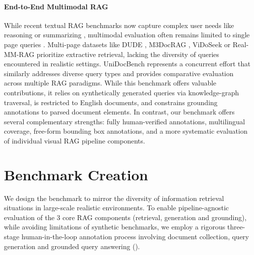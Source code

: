 \paragraph{End-to-End Multimodal RAG} While recent textual RAG benchmarks now capture complex user needs like reasoning or summarizing , multimodal evaluation often remains limited to single page queries . Multi-page datasets like DUDE , M3DocRAG , ViDoSeek  or Real-MM-RAG  prioritize extractive retrieval, lacking the diversity of queries encountered in realistic settings. 
UniDocBench  represents a concurrent effort that similarly addresses diverse query types and provides comparative evaluation across multiple RAG paradigms. While this benchmark offers valuable contributions, it relies on synthetically generated queries via knowledge-graph traversal, is restricted to English documents, and constrains grounding annotations to parsed document elements. In contrast, our benchmark offers several complementary strengths: fully human-verified annotations, multilingual coverage, free-form bounding box annotations, and a more systematic evaluation of individual visual RAG pipeline components.



\section{Benchmark Creation} \label{vidorev3:sec:benchmark creation}

We design the benchmark to mirror the diversity of information retrieval situations in large-scale realistic environments. To enable pipeline-agnostic evaluation of the 3 core RAG components (retrieval, generation and grounding), while avoiding limitations of synthetic benchmarks, we employ a rigorous three-stage human-in-the-loop annotation process involving document collection, query generation and grounded query answering ().

